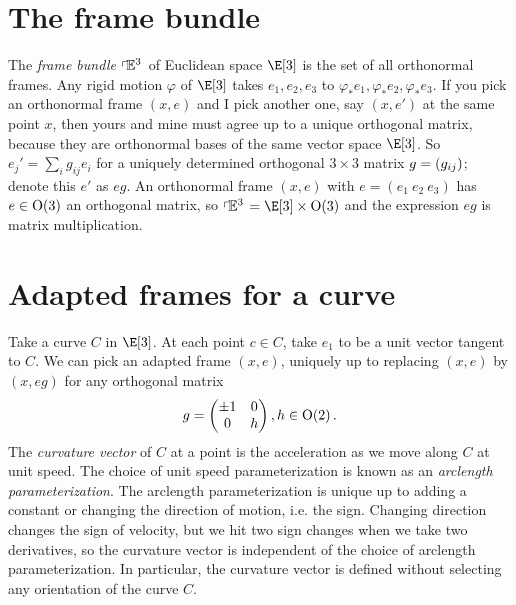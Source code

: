 \section{The frame bundle}
The \emph{frame bundle} \(\left\ulcorner\!\mathbb{E}^{3}\right.\) of Euclidean space \(\E[3]\) is the set of all orthonormal frames. 
Any rigid motion \(\varphi\) of \(\E[3]\) takes \(e_1, e_2, e_3\) to \(\varphi_* e_1, \varphi_* e_2, \varphi_* e_3\).
If you pick an orthonormal frame \((x,e)\) and I pick another one, say \((x,e')\) at the same point \(x\), then yours and mine must agree up to a unique orthogonal matrix, because they are orthonormal bases of the same vector space \(\E[3]\).
So \(e_j' = \sum_i g_{ij} e_i\) for a uniquely determined orthogonal \(3 \times 3\) matrix \(g=\left(g_{ij}\right)\); denote this \(e'\) as \(eg\).
An orthonormal frame \((x,e)\) with \(e=(e_1 \ e_2 \ e_3)\) has \(e \in \textrm{O}\!\left(3\right)\) an orthogonal matrix,  so \(\frameBundleE{3}=\E[3] \times \Orth{3}\) and the expression \(eg\) is matrix multiplication.

\section{Adapted frames for a curve}
Take a curve \(C\) in \(\E[3]\).
At each point \(c \in C\), take \(e_1\) to be a unit vector tangent to \(C\).
We can pick an adapted frame \((x,e)\), uniquely up to replacing \((x,e)\) by \((x,eg)\) for any orthogonal matrix
\[
g=
\begin{pmatrix}
\pm1&0\\
0&h
\end{pmatrix},
h\in\textrm{O}\!\left(2\right).
\]
The \emph{curvature vector}%
  of \(C\) at a point is the acceleration as we move along \(C\) at unit speed.
The choice of unit speed parameterization is known as an \emph{arclength parameterization}.
The arclength parameterization is unique up to adding a constant or changing the direction of motion, i.e. the sign.
Changing direction changes the sign of velocity, but we hit two sign changes when we take two derivatives, so the curvature vector is independent of the choice of arclength parameterization.
In particular, the curvature vector is defined without selecting any orientation of the curve \(C\).

